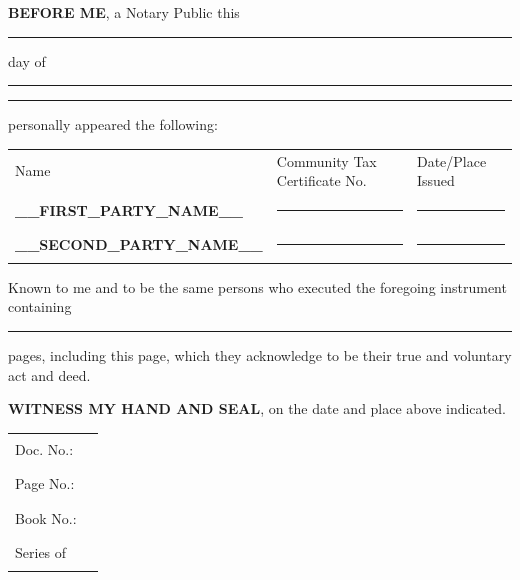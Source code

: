 \documentclass[11pt]{article}
\begin{document}
\vspace{10pt}

\noindent
\textbf{BEFORE ME}, a Notary Public this
\rule{1in}{0.4pt} day of \rule{2in}{0.4pt} \rule{0.8in}{0.4pt}
personally appeared the following:

\vspace{10pt}

\noindent
\begin{tabular}{p{2in}p{2.5in}p{1.5in}}
Name & Community Tax Certificate No. & Date/Place Issued \tabularnewline[10pt]
\textbf{__FIRST_PARTY_NAME__} & \rule{2in}{0.4pt} & \rule{1.5in}{0.4pt} \tabularnewline[10pt]
\textbf{__SECOND_PARTY_NAME__} & \rule{2in}{0.4pt} & \rule{1.5in}{0.4pt}
\end{tabular}

\vspace{10pt}

\noindent
Known to me and to be the same persons who executed the foregoing instrument
containing \rule{1in}{0.4pt} pages, including this page, which they acknowledge
to be their true and voluntary act and deed.

\vspace{10pt}

\noindent
\textbf{WITNESS MY HAND AND SEAL}, on the date and place above indicated.

\vspace{10pt}

\noindent
\begin{tabular}{ll}
Doc. No.: & \rule{1in}{0.4pt} \\
Page No.: & \rule{1in}{0.4pt} \\
Book No.: & \rule{1in}{0.4pt} \\
Series of & \rule{1in}{0.4pt}
\end{tabular}
\end{document}
